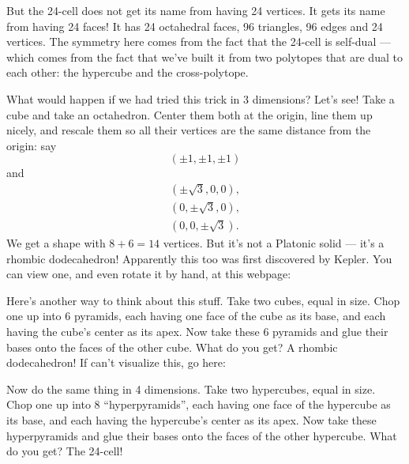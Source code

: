 \documentclass{article}
\def\tightlist{}
\renewcommand{\texttt}[1]{%
  \begingroup
  \ttfamily
  \begingroup\lccode`~=`/\lowercase{\endgroup\def~}{/\discretionary{}{}{}}%
  \begingroup\lccode`~=`[\lowercase{\endgroup\def~}{[\discretionary{}{}{}}%
  \begingroup\lccode`~=`.\lowercase{\endgroup\def~}{.\discretionary{}{}{}}%
  \catcode`/=\active\catcode`[=\active\catcode`.=\active
  \scantokens{#1\noexpand}%
  \endgroup
}
\begin{document}
But the 24-cell does not get its name from having 24 vertices. It gets
its name from having 24 faces! It has 24 octahedral faces, 96 triangles,
96 edges and 24 vertices. The symmetry here comes from the fact that the
24-cell is self-dual --- which comes from the fact that we've built it
from two polytopes that are dual to each other: the hypercube and the
cross-polytope.

What would happen if we had tried this trick in 3 dimensions? Let's see!
Take a cube and take an octahedron. Center them both at the origin, line
them up nicely, and rescale them so all their vertices are the same
distance from the origin: say \[(\pm1,\pm1,\pm1)\] and \[
  \begin{gathered}
    (\pm\sqrt{3},0,0),
  \\(0,\pm\sqrt{3},0),
  \\(0,0,\pm\sqrt{3}).
  \end{gathered}
\] We get a shape with \(8 + 6 = 14\) vertices. But it's not a Platonic
solid --- it's a rhombic dodecahedron! Apparently this too was first
discovered by Kepler. You can view one, and even rotate it by hand, at
this webpage:


Here's another way to think about this stuff. Take two cubes, equal in
size. Chop one up into 6 pyramids, each having one face of the cube as
its base, and each having the cube's center as its apex. Now take these
6 pyramids and glue their bases onto the faces of the other cube. What
do you get? A rhombic dodecahedron! If can't visualize this, go here:


Now do the same thing in 4 dimensions. Take two hypercubes, equal in
size. Chop one up into 8 ``hyperpyramids'', each having one face of the
hypercube as its base, and each having the hypercube's center as its
apex. Now take these hyperpyramids and glue their bases onto the faces
of the other hypercube. What do you get? The 24-cell!
\end{document}
